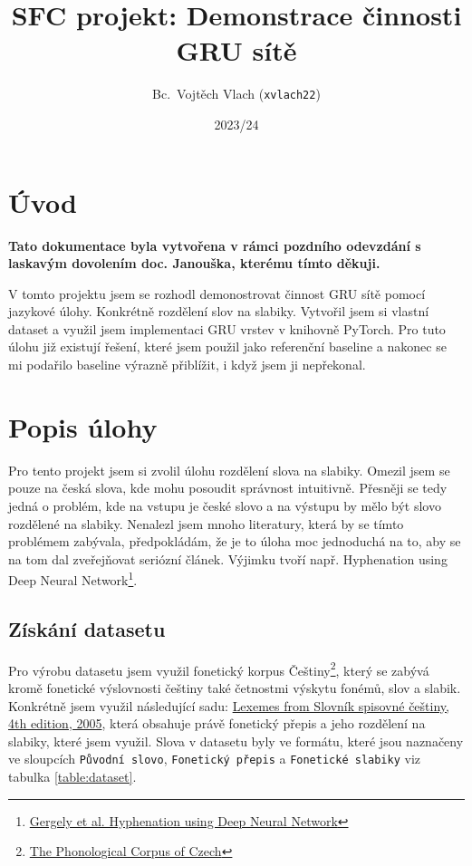\documentclass[a4paper]{article}
\title{SFC projekt: Demonstrace činnosti GRU sítě}
\author{Bc.\ Vojtěch Vlach (\texttt{xvlach22})}
\date{2023/24}
\theoremstyle{definition}
\begin{document}
\maketitle

\section{Úvod}
\textbf{Tato dokumentace byla vytvořena v rámci pozdního odevzdání s laskavým dovolením doc. Janouška, kterému tímto děkuji.}

V tomto projektu jsem se rozhodl demonostrovat činnost GRU sítě pomocí jazykové úlohy. Konkrétně rozdělení slov na slabiky. Vytvořil jsem si vlastní dataset a využil jsem implementaci GRU vrstev v  knihovně PyTorch. Pro tuto úlohu již existují řešení, které jsem použil jako referenční baseline a nakonec se mi podařilo baseline výrazně přiblížit, i když jsem ji nepřekonal.

\section{Popis úlohy}

Pro tento projekt jsem si zvolil úlohu rozdělení slova na slabiky. Omezil jsem se pouze na česká slova, kde mohu posoudit správnost intuitivně. Přesněji se tedy jedná o problém, kde na vstupu je české slovo a na výstupu by mělo být slovo rozdělené na slabiky. Nenalezl jsem mnoho literatury, která by se tímto problémem zabývala, předpokládám, že je to úloha moc jednoduchá na to, aby se na tom dal zveřejňovat seriózní článek. Výjimku tvoří např. Hyphenation using Deep Neural Network\footnote{\href{https://negedng.github.io/files/2018-Hyphenation.pdf}{Gergely et al. Hyphenation using Deep Neural Network}}.

\subsection{Získání datasetu}

Pro výrobu datasetu jsem využil fonetický korpus Češtiny\footnote{\href{https://ujc.avcr.cz/phword}{The Phonological Corpus of Czech}}, který se zabývá kromě fonetické výslovnosti češtiny také četnostmi výskytu fonémů, slov a slabik. Konkrétně jsem využil následující sadu: \href{http://www.ujc.cas.cz/phword/ssc_29-06-16.zip}{Lexemes from Slovník spisovné češtiny, 4th edition, 2005}, která obsahuje právě fonetický přepis a jeho rozdělení na slabiky, které jsem využil. Slova v datasetu byly ve formátu, které jsou naznačeny ve sloupcích \texttt{Původní slovo}, \texttt{Fonetický přepis} a \texttt{Fonetické slabiky} viz tabulka \ref{table:dataset}.
\end{document}
